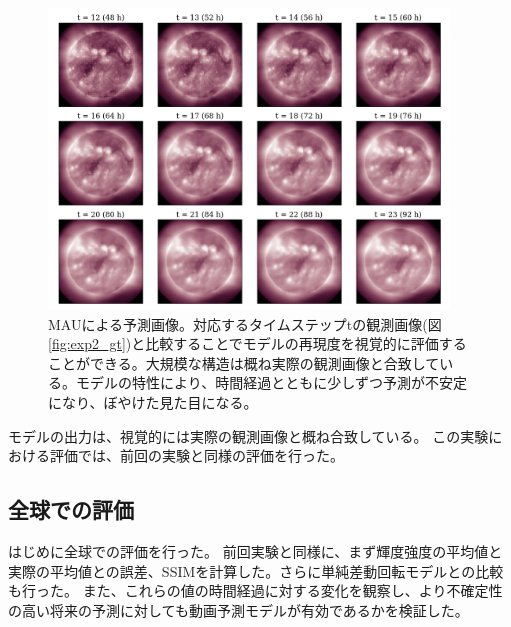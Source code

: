     \begin{figure}[htbp]
      \centering
      \includegraphics[width=0.95\textwidth]{figures/exp2/pd.png}
      \caption{MAUによる予測画像。対応するタイムステップtの観測画像(図\ref{fig:exp2_gt})と比較することでモデルの再現度を視覚的に評価することができる。大規模な構造は概ね実際の観測画像と合致している。モデルの特性により、時間経過とともに少しずつ予測が不安定になり、ぼやけた見た目になる。}
      \label{fig:exp2_pd}
    \end{figure}
    モデルの出力は、視覚的には実際の観測画像と概ね合致している。
    この実験における評価では、前回の実験と同様の評価を行った。
  
    \subsection{全球での評価}
      はじめに全球での評価を行った。
      前回実験と同様に、まず輝度強度の平均値と実際の平均値との誤差、SSIMを計算した。さらに単純差動回転モデルとの比較も行った。
      また、これらの値の時間経過に対する変化を観察し、より不確定性の高い将来の予測に対しても動画予測モデルが有効であるかを検証した。

